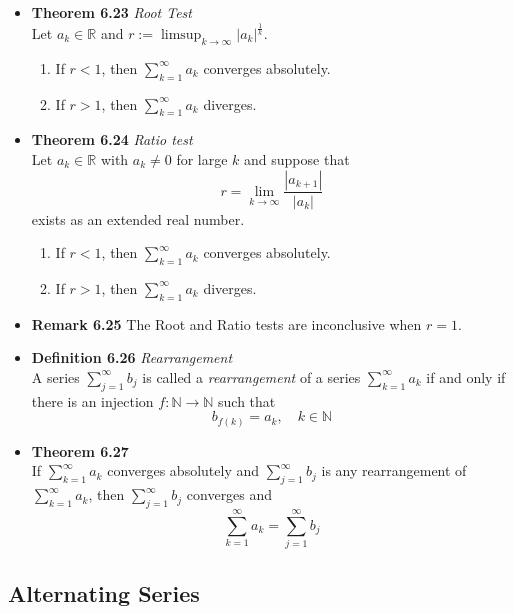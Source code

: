 \documentclass[11pt,a4paper]{article}
\begin{document}
\begin{itemize}
    \item \textbf{Theorem 6.23} \emph{Root Test} \\
        Let $a_k \in \mathbb{R}$ and $r := \limsup_{k \to \infty} |a_k|^{\frac{1}{k}}$.
        \begin{enumerate}
            \item If $r < 1$, then $\sum_{k=1}^\infty a_k$ converges absolutely.
            \item If $r > 1$, then $\sum_{k=1}^\infty a_k$ diverges.
        \end{enumerate}

    \item \textbf{Theorem 6.24} \emph{Ratio test} \\
        Let $a_k \in \mathbb{R}$ with $a_k \neq 0$ for large $k$ and suppose that
        \[
            r = \lim_{k \to \infty} \frac{|a_{k+1}|}{|a_k|}
        \]
        exists as an extended real number.
        \begin{enumerate}
            \item If $r < 1$, then $\sum_{k=1}^\infty a_k$ converges absolutely.
            \item If $r > 1$, then $\sum_{k=1}^\infty a_k$ diverges.
        \end{enumerate}

    \item \textbf{Remark 6.25}
        The Root and Ratio tests are inconclusive when $r = 1$.

    \item \textbf{Definition 6.26} \emph{Rearrangement} \\
        A series $\sum_{j=1}^\infty b_j$ is called a \emph{rearrangement} of a series
        $\sum_{k=1}^\infty a_k$ if and only if there is an injection
        $f : \mathbb{N} \to \mathbb{N}$ such that
        \[
            b_{f(k)} = a_k, \quad k \in \mathbb{N}
        \]

    \item \textbf{Theorem 6.27} \\
        If $\sum_{k=1}^\infty a_k$ converges absolutely and $\sum_{j=1}^\infty b_j$
        is any rearrangement of $\sum_{k=1}^\infty a_k$, then $\sum_{j=1}^\infty b_j$
        converges and
        \[
            \sum_{k=1}^\infty a_k = \sum_{j=1}^\infty b_j
        \]

\end{itemize}

\subsection{Alternating Series}
\end{document}
